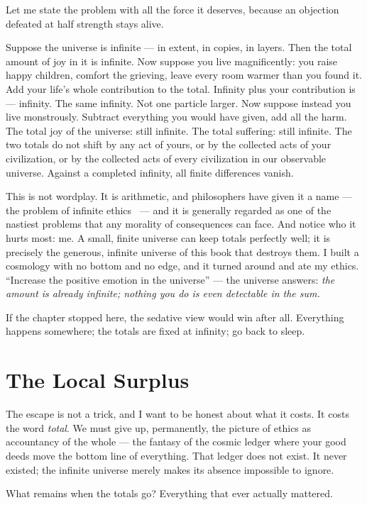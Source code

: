 \documentclass[fontsize=11pt,paper=a4,pagesize=auto,parskip=half-]{scrbook}
\begin{document}
Let me state the problem with all the force it deserves, because an objection defeated at half strength stays alive.

Suppose the universe is infinite --- in extent, in copies, in layers. Then the total amount of joy in it is infinite. Now suppose you live magnificently: you raise happy children, comfort the grieving, leave every room warmer than you found it. Add your life's whole contribution to the total. Infinity plus your contribution is --- infinity. The same infinity. Not one particle larger. Now suppose instead you live monstrously. Subtract everything you would have given, add all the harm. The total joy of the universe: still infinite. The total suffering: still infinite. The two totals do not shift by any act of yours, or by the collected acts of your civilization, or by the collected acts of every civilization in our observable universe. Against a completed infinity, all finite differences vanish.

This is not wordplay. It is arithmetic, and philosophers have given it a name --- the problem of infinite ethics~\cite{bostrom2011} --- and it is generally regarded as one of the nastiest problems that any morality of consequences can face. And notice who it hurts most: me. A small, finite universe can keep totals perfectly well; it is precisely the generous, infinite universe of this book that destroys them. I built a cosmology with no bottom and no edge, and it turned around and ate my ethics. ``Increase the positive emotion in the universe'' --- the universe answers: \emph{the amount is already infinite; nothing you do is even detectable in the sum.}

If the chapter stopped here, the sedative view would win after all. Everything happens somewhere; the totals are fixed at infinity; go back to sleep.

\section{The Local Surplus}

The escape is not a trick, and I want to be honest about what it costs. It costs the word \emph{total}. We must give up, permanently, the picture of ethics as accountancy of the whole --- the fantasy of the cosmic ledger where your good deeds move the bottom line of everything. That ledger does not exist. It never existed; the infinite universe merely makes its absence impossible to ignore.

What remains when the totals go? Everything that ever actually mattered.
\end{document}
